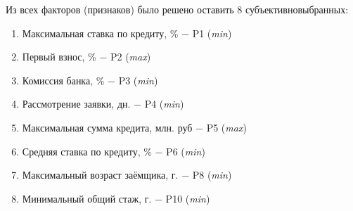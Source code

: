 \documentclass[14pt,fleqn]{extarticle}
\begin{document}
	Из всех факторов (признаков) было решено оставить 8 субъективновыбранных:
	\begin{enumerate}[nolistsep]
		\item Максимальная ставка по кредиту, \% $-$ P1 (\textit{min})
		\item Первый взнос, \% $-$ P2 (\textit{max})
		\item Комиссия банка, \% $-$ P3 (\textit{min})
		\item Рассмотрение заявки, дн. $-$ P4 (\textit{min})
		\item Максимальная сумма кредита, млн. руб $-$ P5 (\textit{max})
		\item Средняя ставка по кредиту, \% $-$ P6 (\textit{min})
		\item Максимальный возраст заёмщика, г. $-$ P8 (\textit{min})
		\item Минимальный общий стаж, г. $-$ P10 (\textit{min})
	\end{enumerate}
\end{document}
